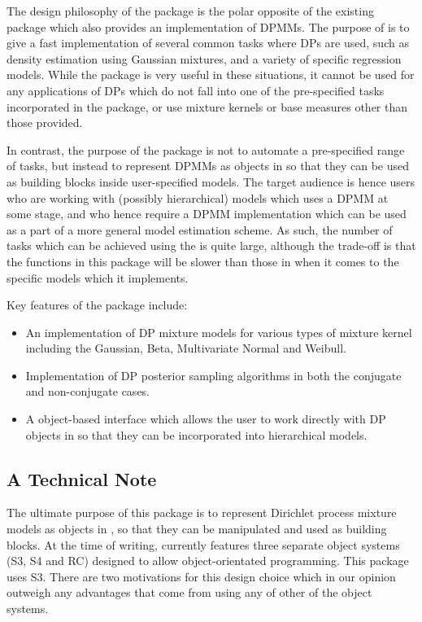\documentclass[nojss]{jss}
\begin{document}
The design philosophy of the  package is the polar opposite of the existing    package which also provides an implementation of DPMMs. The purpose of  is to give a fast implementation of several common tasks where DPs are used, such as density estimation using Gaussian mixtures, and a variety of specific regression models. While the  package is very useful in these situations, it cannot be used for any applications of DPs which do not fall into one of the pre-specified tasks incorporated in the package, or use mixture kernels or base measures other than those provided.

In contrast, the purpose of the  package is not to automate a pre-specified range of tasks, but instead to represent DPMMs as objects in  so that they can be used as building blocks inside user-specified  models. The target audience is hence users who are working with  (possibly hierarchical) models which uses a DPMM at some stage, and who hence require a DPMM implementation which can be used as a part of a more general model estimation scheme.  As such, the number of tasks which can be achieved using the  is quite large, although the trade-off is that the functions in this package will be slower than those in  when it comes to the specific models which it implements.

Key features of the  package include:
\begin{itemize}
\item An implementation of DP mixture models for various types of mixture kernel including the Gaussian, Beta, Multivariate Normal and Weibull.
\item Implementation of DP posterior sampling algorithms in both the conjugate and non-conjugate cases.
\item A object-based interface which allows the user to work directly with DP objects in  so that they can be incorporated into hierarchical models.
\end{itemize}

\subsection{A Technical Note}
The ultimate purpose of this package is to represent Dirichlet process mixture models as objects in , so that they can be manipulated and used as building blocks. At the time of writing,  currently features three separate object systems (S3, S4 and RC) designed to allow object-orientated programming. This package uses S3. There are two motivations for this design choice which in our opinion outweigh any advantages that come from using any of other of the  object systems.
\end{document}
